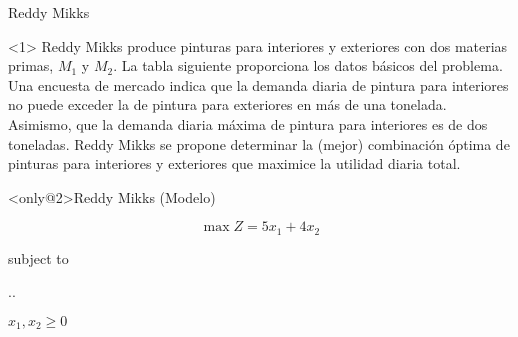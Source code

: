 \begin{frameExample}{Reddy Mikks  }

  \label{example:reddy-mikks}
  \begin{onlyenv}<1>
    Reddy Mikks produce pinturas para interiores y exteriores con dos materias primas, $M_1$ y $M_2$. La tabla siguiente proporciona los datos básicos del problema. Una encuesta de mercado indica que la demanda diaria de pintura para interiores no puede exceder la de pintura para exteriores en más de una tonelada. Asimismo, que la demanda diaria máxima de pintura para interiores es de dos toneladas. Reddy Mikks se propone determinar la (mejor) combinación óptima de pinturas para interiores y exteriores que maximice la utilidad diaria total.%

    {\centering
      \par}
  \end{onlyenv}
  
\begin{block}<only@2>{Reddy Mikks (Modelo) }\justifying

\[\max Z = 5x_1 + 4x_2\]

{\centering
  subject to

  \sysdelim..

  \vspace{5mm}
  $x_1, x_2  \geq 0$
  \par}
\end{block}
\end{frameExample}




